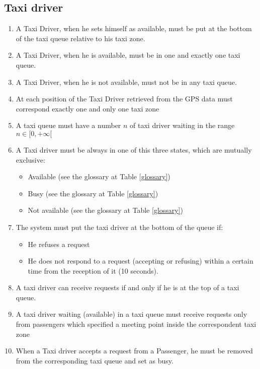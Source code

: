 \subsection{Taxi driver}
\begin{enumerate}[label=R.T.{\arabic*})]
\item A Taxi Driver, when he sets himself as available, must be put at the bottom of the taxi queue relative to his taxi zone.
\item A Taxi Driver, when he is available, must be in one and exactly one taxi queue.
\item A Taxi Driver, when he is not available, must not be in any taxi queue.
\item At each position of the Taxi Driver retrieved from the GPS data must correspond exactly one and only one taxi zone
\item A taxi queue must have a number $n$ of taxi driver waiting in the range $n\in[0,+\infty[$
\item A Taxi driver must be always in one of this three states, which are mutually exclusive:
\begin{itemize}
	\item Available (see the glossary at Table \ref{glossary})
	\item Busy (see the glossary at Table \ref{glossary})
	\item Not available	(see the glossary at Table \ref{glossary})
\end{itemize}
\item The system must put the taxi driver at the bottom of the queue if:
\begin{itemize}
	\item He refuses a request
	\item He does not respond to a request (accepting or refusing) within a certain time from the reception of it (10 seconds).
\end{itemize}
\item A taxi driver can receive requests if and only if he is at the top of a taxi queue.
\item A taxi driver waiting (available) in a taxi queue must receive requests only from passengers which specified a meeting point inside the correspondent taxi zone
\item When a Taxi driver accepts a request from a Passenger, he must be removed from the corresponding taxi queue and set as busy.
\end{enumerate}
